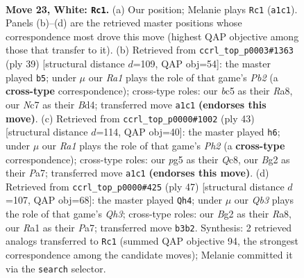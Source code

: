 \documentclass[11pt]{article}
\begin{document}
\clearpage

\begin{figure}[p]\centering
\begin{subfigure}{0.46\textwidth}\centering
\resizebox{\linewidth}{!}{%
\newchessgame
\chessboard[
  setfen={r1b4r/1pN3k1/1n6/2b3pp/1n5q/1Q1PpP2/P5B1/R3NRK1 w - - 2 23},
  showmover=false,
  pgfstyle=straightmove, color=movearrow, markmove={a1-c1}
]}
\caption{}
\end{subfigure}\hfill
\begin{subfigure}{0.46\textwidth}\centering
\resizebox{\linewidth}{!}{%
\newchessgame
\chessboard[
  setfen={r4rk1/pp3p1p/6p1/3Nq2n/R1Bb1p2/5Q2/PPP3PP/1K5R b - - 3 20},
  showmover=false,
  pgfstyle=straightmove, color=movearrow, markmove={b7-b5}
]}
\caption{}
\end{subfigure}
\\[4pt]
\begin{subfigure}{0.46\textwidth}\centering
\resizebox{\linewidth}{!}{%
\newchessgame
\chessboard[
  setfen={2q1r1k1/p3bppp/2bp1n2/r7/3BP3/2N3QP/2P1B1P1/3R1R1K b - - 3 22},
  showmover=false,
  pgfstyle=straightmove, color=movearrow, markmove={h7-h6}
]}
\caption{}
\end{subfigure}\hfill
\begin{subfigure}{0.46\textwidth}\centering
\resizebox{\linewidth}{!}{%
\newchessgame
\chessboard[
  setfen={r4r1k/pp3p1p/2npb2q/3N2N1/2BP2n1/8/PPPQ2R1/R5K1 b - - 10 24},
  showmover=false,
  pgfstyle=straightmove, color=movearrow, markmove={h6-h4}
]}
\caption{}
\end{subfigure}
\caption{\textbf{Move 23, White: \texttt{Rc1}.} (a) Our position; Melanie plays \texttt{Rc1} (\texttt{a1c1}). Panels (b)--(d) are the retrieved master positions whose correspondence most drove this move (highest QAP objective among those that transfer to it). (b) Retrieved from \texttt{ccrl\_top\_p0003\#1363} (ply 39) [structural distance $d$=109, QAP obj=54]: the master played \texttt{b5}; under $\mu$ our \emph{Ra1} plays the role of that game's \emph{Pb2} (a \textbf{cross-type} correspondence); cross-type roles: our \emph{b}c5 as their \emph{R}a8, our \emph{N}c7 as their \emph{B}d4; transferred move \texttt{a1c1} \textbf{(endorses this move)}. (c) Retrieved from \texttt{ccrl\_top\_p0000\#1002} (ply 43) [structural distance $d$=114, QAP obj=40]: the master played \texttt{h6}; under $\mu$ our \emph{Ra1} plays the role of that game's \emph{Ph2} (a \textbf{cross-type} correspondence); cross-type roles: our \emph{p}g5 as their \emph{Q}c8, our \emph{B}g2 as their \emph{P}a7; transferred move \texttt{a1c1} \textbf{(endorses this move)}. (d) Retrieved from \texttt{ccrl\_top\_p0000\#425} (ply 47) [structural distance $d$=107, QAP obj=68]: the master played \texttt{Qh4}; under $\mu$ our \emph{Qb3} plays the role of that game's \emph{Qh3}; cross-type roles: our \emph{B}g2 as their \emph{R}a8, our \emph{R}a1 as their \emph{P}a7; transferred move \texttt{b3b2}. Synthesis: 2 retrieved analogs transferred to \texttt{Rc1} (summed QAP objective 94, the strongest correspondence among the candidate moves); Melanie committed it via the \texttt{search} selector.}
\label{fig:thought-m44}
\end{figure}
\end{document}
